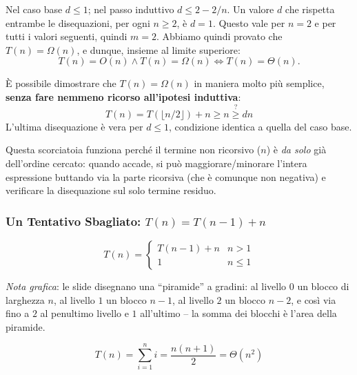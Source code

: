 \documentclass[12pt, a4paper]{article}
\begin{document}
\begin{tcolorbox}[colback=lightergray!5, colframe=tocsubsec, title=\textbf{Conclusione}]
Nel caso base $d\le 1$; nel passo induttivo $d\le 2-2/n$. Un valore $d$ che rispetta entrambe le disequazioni, per ogni $n\ge 2$, è $d=1$. Questo vale per $n=2$ e per tutti i valori seguenti, quindi $m=2$. Abbiamo quindi provato che $T(n)=\Omega(n)$, e dunque, insieme al limite superiore:
$$T(n)=O(n) \wedge T(n)=\Omega(n) \iff T(n)=\Theta(n).$$
\end{tcolorbox}

\begin{tcolorbox}[colback=lightergray!10, colframe=tocsec, title=\textbf{Una Scorciatoia per il Limite Inferiore}]
È possibile dimostrare che $T(n)=\Omega(n)$ in maniera molto più semplice, \textbf{senza fare nemmeno ricorso all'ipotesi induttiva}:
$$T(n) = T(\lfloor n/2\rfloor)+n \ge n \overset{?}{\ge} dn$$
L'ultima disequazione è vera per $d\le 1$, condizione identica a quella del caso base.
\end{tcolorbox}

\begin{tcolorbox}[colback=lightergray!5, colframe=tocsubsec, title=\textbf{Nota}]
Questa scorciatoia funziona perché il termine non ricorsivo ($n$) è \emph{da solo} già dell'ordine cercato: quando accade, si può maggiorare/minorare l'intera espressione buttando via la parte ricorsiva (che è comunque non negativa) e verificare la disequazione sul solo termine residuo.
\end{tcolorbox}


\subsubsection{Un Tentativo Sbagliato: \texorpdfstring{$T(n)=T(n-1)+n$}{T(n)=T(n-1)+n}}

$$T(n) = \begin{cases} T(n-1)+n & n>1 \\ 1 & n\le 1 \end{cases}$$

\textit{Nota grafica}: le slide disegnano una ``piramide'' a gradini: al livello $0$ un blocco di larghezza $n$, al livello $1$ un blocco $n-1$, al livello $2$ un blocco $n-2$, e così via fino a $2$ al penultimo livello e $1$ all'ultimo -- la somma dei blocchi è l'area della piramide.

$$T(n) = \sum_{i=1}^{n} i = \frac{n(n+1)}{2} = \Theta(n^2)$$
\end{document}

